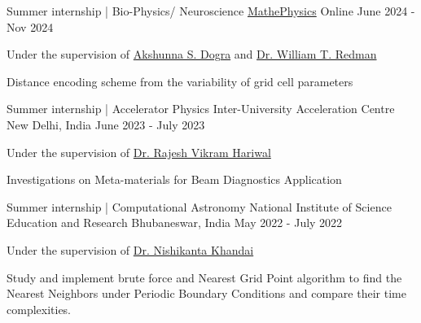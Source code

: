

\begin{cventries}


\cventry
{Summer internship | Bio-Physics/ Neuroscience} %
{\href{https://github.com/MathePhysics}{MathePhysics}} %
{Online} %
{June 2024 - Nov 2024} %
{
	\begin{cvitems} %
		\item{Under the supervision of \href{https://asdogra.mit.edu/mentorship}{Akshunna S. Dogra}} and \href{https://wredman4.wixsite.com/wtredman}{Dr. William T. Redman}
		\item Distance encoding scheme from the variability of grid cell parameters\\
	\end{cvitems}
}

\cventry
{Summer internship | Accelerator Physics} %
{Inter-University Acceleration Centre} %
{New Delhi, India} %
{June 2023 - July 2023} %
{
	\begin{cvitems} %
		\item{Under the supervision of \href{https://www.researchgate.net/profile/Dr-Hariwal}{Dr. Rajesh Vikram Hariwal}}
		\item Investigations on Meta-materials for Beam Diagnostics Application \\
	\end{cvitems}
}


 	\cventry
{Summer internship | Computational Astronomy} %
{National Institute of Science Education and Research} %
{Bhubaneswar, India} %
{May 2022 - July 2022} %
{
  \begin{cvitems} %
     	\item{Under the supervision of \href{https://niser.irins.org/profile/241972}{Dr. Nishikanta Khandai}}
    \item Study and implement brute force and Nearest Grid Point algorithm to find the Nearest Neighbors under Periodic Boundary Conditions and compare their time complexities. \\
  \end{cvitems}
}

\end{cventries}
